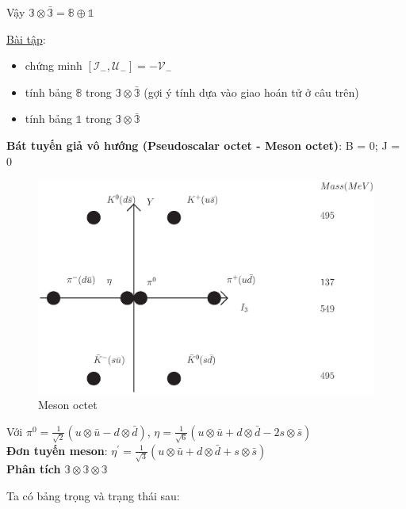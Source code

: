 \documentclass{report}
\begin{document}
Vậy \( \mathbb{3} \otimes \bar{\mathbb{3}} = \mathbb{8} \oplus \mathbb{1} \)

\underline{Bài tập}:

	\begin{itemize}
		\item chứng minh \( \left[ \mathcal{I}_{-}, \mathcal{U}_{-} \right] = - \mathcal{V}_{-} \)
		\item tính bảng \(\mathbb{8}\) trong \( \mathbb{3} \otimes \bar{\mathbb{3}} \) (gợi ý tính dựa vào giao hoán tử ở câu trên)
		\item tính bảng \(\mathbb{1}\) trong \( \mathbb{3} \otimes \bar{\mathbb{3}} \)
	\end{itemize}
	
\textbf{Bát tuyến giả vô hướng (Pseudoscalar octet - Meson octet)}: B = 0; J = 0

	\begin{figure}[!htb]
		\centering
		\includegraphics[scale=0.5]{diagram12.eps}
		\caption{Meson octet}
	\end{figure}
	
Với \( \pi^{0} = \frac{1}{\sqrt{2}} \left( u \otimes \bar{u} - d \otimes \bar{d} \right) \), \( \eta = \frac{1}{\sqrt{6}} \left( u \otimes \bar{u} + d \otimes \bar{d} - 2 s \otimes \bar{s} \right) \) \\

\textbf{Đơn tuyến meson}: \( \eta^{'} = \frac{1}{\sqrt{3}} \left( u \otimes \bar{u} + d \otimes \bar{d} + s \otimes \bar{s} \right) \) \\

\textbf{Phân tích} \( \mathbb{3} \otimes \mathbb{3} \otimes \mathbb{3} \)

Ta có bảng trọng và trạng thái sau:
\end{document}
